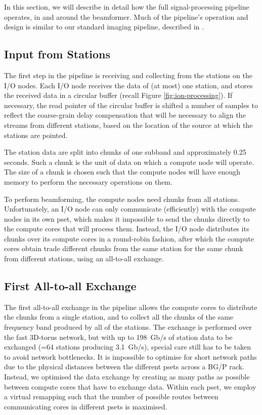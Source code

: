 \documentclass{llncs}
\begin{document}
In this section, we will describe in detail how the full signal-processing pipeline operates, in and around the beamformer. Much of the pipeline's operation and design is similar to our standard imaging pipeline, described in \cite{Romein:10a}.

\subsection{Input from Stations}
The first step in the pipeline is receiving and collecting from the stations on the I/O nodes. Each I/O node receives the data of (at most) one station, and stores the received data in a circular buffer (recall Figure \ref{fig:ion-processing}). If necessary, the read pointer of the circular buffer is shifted a number of samples to reflect the coarse-grain delay compensation that will be necessary to align the streams from different stations, based on the location of the source at which the stations are pointed.

The station data are split into chunks of one subband and approximately 0.25 seconds. Such a chunk is the unit of data on which a compute node will operate. The size of a chunk is chosen such that the compute nodes will have enough memory to perform the necessary operations on them.

To perform beamforming, the compute nodes need chunks from all stations. Unfortunately, an I/O node can only communicate (efficiently) with the compute nodes in its own pset, which makes it impossible to send the chunks directly to the compute cores that will process them. Instead, the I/O node distributes its chunks over its compute cores in a round-robin fashion, after which the compute cores obtain trade different chunks from the same station for the same chunk from different stations, using an all-to-all exchange.

\subsection{First All-to-all Exchange}

The first all-to-all exchange in the pipeline allows the compute cores to distribute the chunks from a single station, and to collect all the chunks of the same frequency band produced by all of the stations. The exchange is performed over the fast 3D-torus network, but with up to 198~Gb/s of station data to be exchanged (=64 stations producing 3.1~Gb/s), special care still has to be taken to avoid network bottlenecks. It is impossible to optimise for short network paths due to the physical distances between the different psets across a BG/P rack. Instead, we optimised the data exchange by creating as many paths as possible between compute cores that have to exchange data. Within each pset, we employ a virtual remapping such that the number of possible routes between communicating cores in different psets is maximised.
\end{document}
